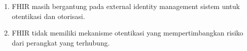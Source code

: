 \begin{enumerate}
    \item FHIR masih bergantung pada external identity management sistem untuk otentikasi dan otorisasi.
    \item FHIR tidak memiliki mekanisme otentikasi yang mempertimbangkan risiko dari perangkat yang terhubung.
\end{enumerate}